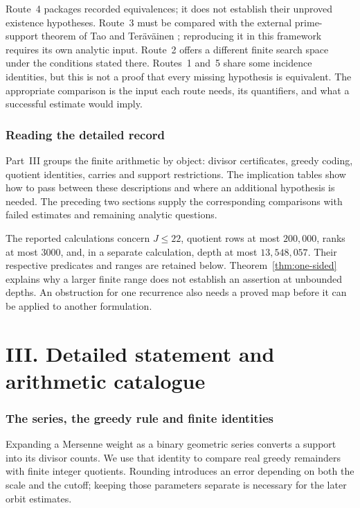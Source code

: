 \documentclass[11pt]{article}
\theoremstyle{plain}
\theoremstyle{definition}
\theoremstyle{remark}
\begin{document}
Route~4 packages recorded equivalences; it does not establish their
unproved existence hypotheses.  Route~3 must be compared with the external
prime-support theorem of Tao and Ter\"av\"ainen
\cite[Theorem~1.3]{taoteravainen2025}; reproducing it in this framework
requires its own analytic input.  Route~2 offers a different finite
search space under the conditions stated there.  Routes~1 and~5 share
some incidence identities, but this is not a proof that every missing
hypothesis is equivalent.  The appropriate comparison is the input each
route needs, its quantifiers, and what a successful estimate would imply.

\section{Reading the detailed record}
\label{sec:257-howto}
Part~III groups the finite arithmetic by object: divisor certificates,
greedy coding, quotient identities, carries and support restrictions.
The implication tables show how to pass between these descriptions and
where an additional hypothesis is needed. The preceding two sections
supply the corresponding comparisons with failed estimates and remaining
analytic questions.

The reported calculations concern $J\le22$, quotient rows at most
$200{,}000$, ranks at most $3000$, and, in a separate calculation, depth
at most $13{,}548{,}057$. Their respective predicates and ranges are
retained below. Theorem~\ref{thm:one-sided} explains why a larger finite
range does not establish an assertion at unbounded depths. An
obstruction for one recurrence also needs a proved map before it can
be applied to another formulation.
\clearpage
\part*{III. Detailed statement and arithmetic catalogue}
\section{The series, the greedy rule and finite identities}
Expanding a Mersenne weight as a binary geometric series converts a
support into its divisor counts. We use that identity to compare real
greedy remainders with finite integer quotients. Rounding introduces an
error depending on both the scale and the cutoff; keeping those
parameters separate is necessary for the later orbit estimates.
\end{document}
